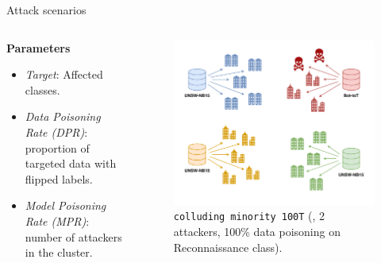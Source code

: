 \begin{frame}{Attack scenarios}
    \begin{columns}
        \begin{column}{.5\textwidth}
            \textbf{Parameters}
            \begin{itemize}
                \item \textit{Target}: Affected classes.
                \item \textit{Data Poisoning Rate (DPR)}: proportion of targeted data with flipped labels.
                \item \textit{Model Poisoning Rate (MPR)}: number of attackers in the cluster.
            \end{itemize}
        \end{column}
        \begin{column}{.5\textwidth}
          \begin{figure}
            \captionsetup{font=small, labelfont=small}
            \includegraphics[width=\linewidth]{figures/eval/setup/poisoning.pdf}%
            \caption{\texttt{colluding minority 100T} (\ie, 2 attackers, 100\% data poisoning on Reconnaissance class).}
          \end{figure}
        \end{column}
    \end{columns}
\end{frame}

